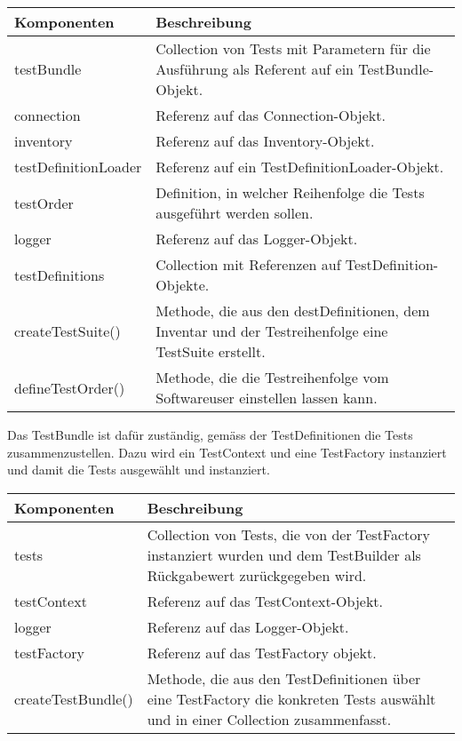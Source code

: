 \documentclass[]{subfiles}
\begin{document}
	\begin{tabularx}{\textwidth}{lX}
		\toprule
			Komponenten & Beschreibung \\
		\midrule
			testBundle & Collection von Tests mit Parametern für die Ausführung als Referent auf ein TestBundle-Objekt. \\
			connection & Referenz auf das Connection-Objekt. \\
			inventory & Referenz auf das Inventory-Objekt. \\
			testDefinitionLoader & Referenz auf ein TestDefinitionLoader-Objekt.\\
			testOrder & Definition, in welcher Reihenfolge die Tests ausgeführt werden sollen. \\
			logger & Referenz auf das Logger-Objekt.  \\
			testDefinitions & Collection mit Referenzen auf TestDefinition-Objekte. \\
		\midrule
			createTestSuite() & Methode, die aus den destDefinitionen, dem Inventar und der Testreihenfolge eine TestSuite erstellt. \\
			defineTestOrder() & Methode, die die Testreihenfolge vom Softwareuser einstellen lassen kann. \\
		\bottomrule
	\end{tabularx}
	\newpage

	Das TestBundle ist dafür zuständig, gemäss der TestDefinitionen die Tests zusammenzustellen. 
	Dazu wird ein TestContext und eine TestFactory instanziert und damit die Tests ausgewählt und instanziert.

	\begin{tabularx}{\textwidth}{lX}
		\toprule
			Komponenten & Beschreibung \\
		\midrule
			tests & Collection von Tests, die von der TestFactory instanziert wurden und dem TestBuilder als Rückgabewert zurückgegeben wird. \\
			testContext & Referenz auf das TestContext-Objekt. \\
			logger & Referenz auf das Logger-Objekt. \\
			testFactory & Referenz auf das TestFactory objekt. \\
		\midrule
			createTestBundle() & Methode, die aus den TestDefinitionen über eine TestFactory die konkreten Tests auswählt und in einer Collection zusammenfasst. \\
		\bottomrule
	\end{tabularx}
\end{document}
